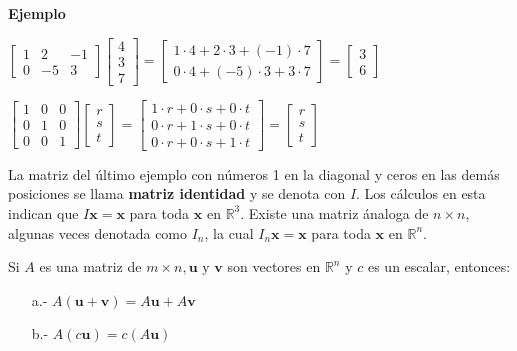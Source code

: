 \documentclass{article}
\begin{document}
\begin{large}
    \textbf{Ejemplo}
\end{large}

$\begin{bmatrix}
    1 & 2 & -1\\
    0 & -5 & 3
\end{bmatrix}
\begin{bmatrix} 4\\3\\7 \end{bmatrix}
=\begin{bmatrix}
    1\cdot4 + 2\cdot3 + (-1)\cdot7\\
    0\cdot4 + (-5)\cdot3 + 3\cdot7 
\end{bmatrix}
= \begin{bmatrix} 3\\6 \end{bmatrix}$

$\begin{bmatrix}
    1 & 0 & 0\\
    0 & 1 & 0\\
    0 & 0 & 1
\end{bmatrix}
\begin{bmatrix} r\\s\\t \end{bmatrix}
=\begin{bmatrix}
    1\cdot r + 0\cdot s + 0\cdot t\\
    0\cdot r + 1\cdot s + 0\cdot t\\
    0\cdot r + 0\cdot s + 1\cdot t
\end{bmatrix}
= \begin{bmatrix} r\\s\\t \end{bmatrix}$

La matriz del último ejemplo con números 1 en la diagonal y ceros en las demás posiciones se llama \textbf{matriz identidad} y se denota con $I$. Los cálculos en esta indican que $I\mathbf{x} =  \mathbf{x}$ para toda $\mathbf{x}$ en $\mathbb{R}^3$. Existe una matriz ánaloga de $n \times n$, algunas veces denotada como $I_n$, la cual $I_n\mathbf{x} = \mathbf{x}$ para toda $\mathbf{x}$ en $\mathbb{R}^n$.

\begin{tcolorbox}[colback=red!10!white, colframe=red!70!black, title=Propiedades del producto matriz-vector $A\mathbf{x}$]
    Si $A$ es una matriz de $m\times n, \mathbf{u} \text{ y } \mathbf{v}$ son vectores en $\mathbb{R}^n$ y $c$ es un escalar, entonces: 
    \begin{itemize}
        \item[a.-]  $A(\mathbf{u} + \mathbf{v}) = A\mathbf{u} + A\mathbf{v}$
        \item[b.-] $A(c\mathbf{u}) = c(A\mathbf{u})$ 
    \end{itemize}

\end{tcolorbox}
\end{document}
